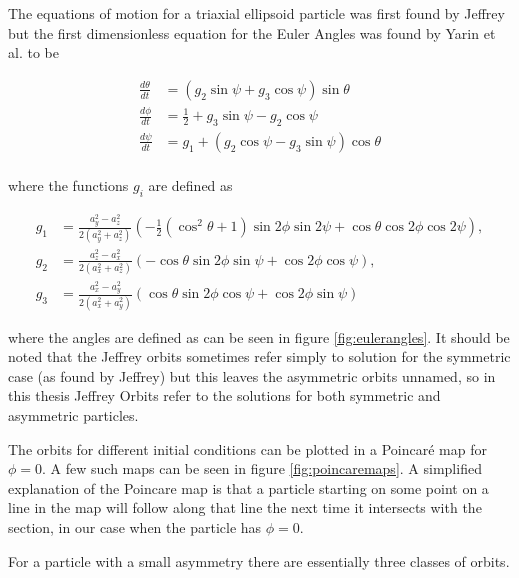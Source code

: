 The equations of motion for a triaxial ellipsoid particle was first found by Jeffrey \cite{Jeffrey} but the first dimensionless equation for the Euler Angles was found by Yarin et al. \cite{Yarin} to be


\begin{subequations}\label{eq:jeffrey}
\begin{align}
\frac{d\theta}{dt} 	&= (g_2 \sin \psi + g_3 \cos \psi ) \sin \theta \\
\frac{d\phi}{dt} 	&= \tfrac{1}{2} + g_3\sin \psi - g_2 \cos \psi\\
\frac{d\psi}{dt}	&= g_1 + (g_2\cos \psi - g_3\sin \psi) \cos \theta \\
\end{align}
\end{subequations}

where the functions  $g_i$ are defined as

\begin{subequations}
\begin{align}
g_1 &= \frac{a_y^2 - a_z^2}{2(a_y^2 + a_z^2)} 
		\left(-\tfrac{1}{2}(\cos^2 \theta + 1 )\sin 2\phi \sin 2\psi + \cos\theta \cos 2\phi \cos 2\psi \right), \\
g_2 &= \frac{a_z^2 - a_x^2}{2(a_x^2 + a_z^2)}
		\left( -\cos\theta \sin 2\phi \sin\psi  +  \cos 2\phi \cos\psi \right), \\
g_3 &= \frac{a_x^2 - a_y^2}{2(a_x^2 + a_y^2)}
		\left( \cos\theta \sin 2\phi \cos\psi + \cos 2\phi \sin\psi \right)
\end{align}
\end{subequations}

where the angles are defined as can be seen in figure \ref{fig:eulerangles}. It should be noted that the Jeffrey orbits sometimes refer simply to solution for the symmetric case (as found by Jeffrey) but this leaves the asymmetric orbits unnamed, so in this thesis Jeffrey Orbits refer to the solutions for both symmetric and asymmetric particles.

The orbits for different initial conditions can be plotted in a Poincaré map \cite{poincare} for $\phi = 0$. A few such maps can be seen in figure \ref{fig:poincaremaps}. A simplified explanation of the Poincare map is that a particle starting on some point on a line in the map will follow along that line the next time it intersects with the section, in our case when the particle has $\phi=0$. 

For a particle with a small asymmetry there are essentially three classes of orbits.

